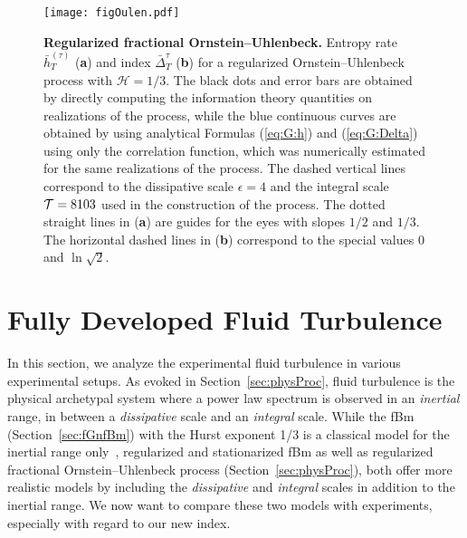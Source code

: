 \documentclass[aps,pra,groupedaddress,notitlepage]{revtex4-1}
\begin{document}
\begin{figure}[htb]
\texttt{[image: figOulen.pdf]}%
\caption{{\bf Regularized fractional Ornstein--Uhlenbeck.} 
Entropy rate $\bar{h}_T^{(\tau)}$ (\textbf{a}) and index $\bar{\Delta}_T^{\tau}$ (\textbf{b}) for a regularized Ornstein--Uhlenbeck process with $\mathcal{H}=1/3$. 
The black dots and error bars are obtained by directly  computing the information theory quantities on realizations of the process, while the blue continuous curves are obtained by using analytical Formulas (\ref{eq:G:h}) and (\ref{eq:G:Delta}) using only the correlation function, which was numerically estimated for the same realizations of the process.
The dashed vertical lines correspond to the dissipative scale $\epsilon=4$ and the integral scale ${\cal T}=8103$ used in the construction of the process.
The dotted straight lines in (\textbf{a}) are guides for the eyes with slopes $1/2$ and $1/3$. 
The horizontal dashed lines in (\textbf{b}) correspond to the special values $0$ and $\ln\sqrt{2}$.
}
\label{fig:Oulenbeck1}
\end{figure}


\section{Fully Developed Fluid Turbulence}
\label{sec:turbulence}

In this section, we analyze the experimental fluid turbulence in various experimental setups. As evoked in Section~\ref{sec:physProc}, fluid turbulence is the physical archetypal system where a power law spectrum is observed in an {\em inertial} range, in between a {\em dissipative} scale and an {\em integral} scale.
%
While the fBm (Section~\ref{sec:fGnfBm}) with the Hurst exponent 1/3 is a classical model for the inertial range only~\cite{Kolmogorov1991,Frisch:1995}, regularized and stationarized fBm as well as regularized fractional Ornstein--Uhlenbeck process (Section~\ref{sec:physProc}), both offer more realistic models by including the {\em dissipative} and {\em integral} scales in addition to the inertial range. We now want to compare these two models with experiments, especially with regard to our new index.
\end{document}
